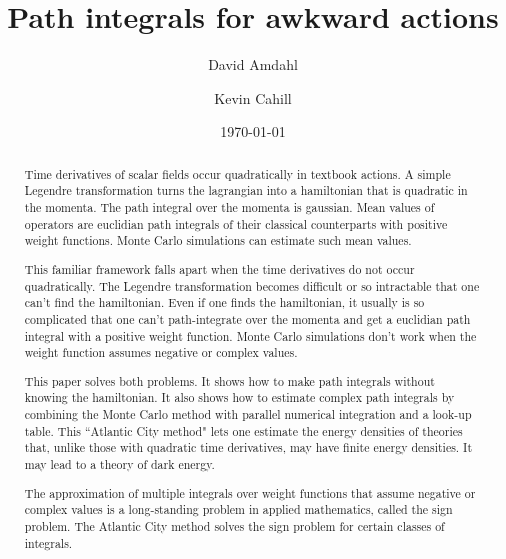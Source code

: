 \documentclass[prd,preprint,floatfix,showpacs]{revtex4-1}
\begin{document}
\title{Path integrals for awkward actions}

\author{David Amdahl} 
\author{Kevin Cahill}

\date{\today}
 

\begin {abstract}
Time derivatives of scalar fields
occur quadratically in textbook actions.
A simple Legendre transformation 
turns the lagrangian into a 
hamiltonian that is quadratic in the momenta.
The path integral over the momenta is gaussian.
Mean values of operators are 
euclidian path integrals of their classical counterparts
with positive weight functions.
Monte Carlo simulations can estimate 
such mean values.
\par
This familiar framework falls apart
when the time derivatives do not occur
quadratically.  
The Legendre transformation 
becomes difficult or so intractable
that one can't find the hamiltonian.  
Even if one finds the hamiltonian, 
it usually is so complicated
that one can't path-integrate 
over the momenta and get 
a euclidian path integral with
a positive weight function.
Monte Carlo simulations don't work
when the weight function
assumes negative or complex values.
\par
This paper solves both problems.
It shows how to make path integrals 
without knowing the hamiltonian. 
It also shows how to estimate
complex path integrals 
by combining the Monte Carlo method
with parallel numerical integration and
a look-up table. 
This ``Atlantic City method" lets one
estimate the energy densities
of theories that, unlike those 
with quadratic time derivatives,
may have finite energy densities.
It may lead to a theory of dark energy.
\par 
The approximation of multiple
integrals over weight functions
that assume negative or complex values
is a long-standing problem 
in applied mathematics,
called the sign problem.
The Atlantic City method
solves the sign problem 
for certain classes of integrals.
\end {abstract}


\maketitle
\end{document}
